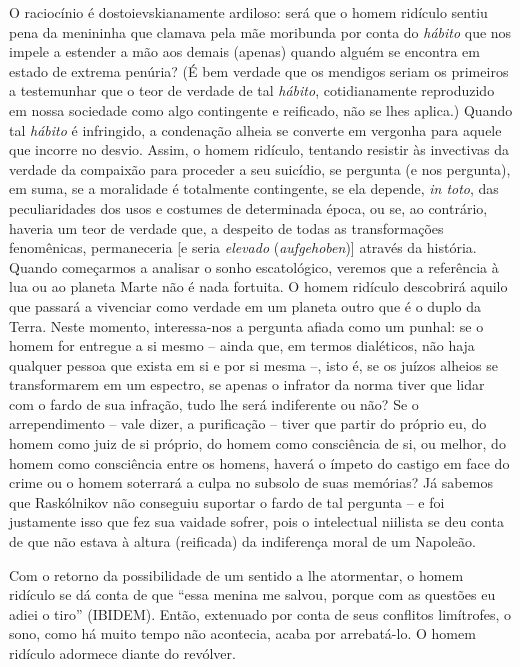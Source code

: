 O raciocínio é dostoievskianamente ardiloso: será que o homem ridículo
sentiu pena da menininha que clamava pela mãe moribunda por conta do
\emph{hábito} que nos impele a estender a mão aos demais (apenas) quando
alguém se encontra em estado de extrema penúria? (É bem verdade que os
mendigos seriam os primeiros a testemunhar que o teor de verdade de tal
\emph{hábito}, cotidianamente reproduzido em nossa sociedade como algo
contingente e reificado, não se lhes aplica.) Quando tal \emph{hábito} é
infringido, a condenação alheia se converte em vergonha para aquele que
incorre no desvio. Assim, o homem ridículo, tentando resistir às
invectivas da verdade da compaixão para proceder a seu suicídio, se
pergunta (e nos pergunta), em suma, se a moralidade é totalmente
contingente, se ela depende, \emph{in toto}, das peculiaridades dos usos
e costumes de determinada época, ou se, ao contrário, haveria um teor de
verdade que, a despeito de todas as transformações fenomênicas,
permaneceria {[}e seria \emph{elevado} (\emph{aufgehoben}){]} através da
história. Quando começarmos a analisar o sonho escatológico, veremos que
a referência à lua ou ao planeta Marte não é nada fortuita. O homem
ridículo descobrirá aquilo que passará a vivenciar como verdade em um
planeta outro que é o duplo da Terra. Neste momento, interessa-nos a
pergunta afiada como um punhal: se o homem for entregue a si mesmo --
ainda que, em termos dialéticos, não haja qualquer pessoa que exista em
si e por si mesma --, isto é, se os juízos alheios se transformarem em
um espectro, se apenas o infrator da norma tiver que lidar com o fardo
de sua infração, tudo lhe será indiferente ou não? Se o arrependimento
-- vale dizer, a purificação -- tiver que partir do próprio eu, do homem
como juiz de si próprio, do homem como consciência de si, ou melhor, do
homem como consciência entre os homens, haverá o ímpeto do castigo em
face do crime ou o homem soterrará a culpa no subsolo de suas memórias?
Já sabemos que Raskólnikov não conseguiu suportar o fardo de tal
pergunta -- e foi justamente isso que fez sua vaidade sofrer, pois o
intelectual niilista se deu conta de que não estava à altura (reificada)
da indiferença moral de um Napoleão.

Com o retorno da possibilidade de um sentido a lhe atormentar, o homem
ridículo se dá conta de que ``essa menina me salvou, porque com as
questões eu adiei o tiro'' (IBIDEM). Então, extenuado por conta de seus
conflitos limítrofes, o sono, como há muito tempo não acontecia, acaba
por arrebatá-lo. O homem ridículo adormece diante do revólver.

